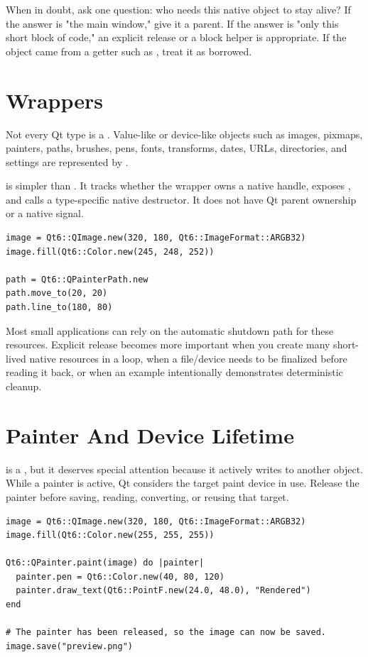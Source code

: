 When in doubt, ask one question: who needs this native object to stay alive? If the answer is "the main window," give it a parent. If the answer is "only this short block of code," an explicit  release or a block helper is appropriate. If the object came from a getter such as , treat it as borrowed.

\section{ Wrappers}

Not every Qt type is a . Value-like or device-like objects such as images, pixmaps, painters, paths, brushes, pens, fonts, transforms, dates, URLs, directories, and settings are represented by .

 is simpler than . It tracks whether the wrapper owns a native handle, exposes , and calls a type-specific native destructor. It does not have Qt parent ownership or a native  signal.

\begin{lstlisting}[style=crystal]
image = Qt6::QImage.new(320, 180, Qt6::ImageFormat::ARGB32)
image.fill(Qt6::Color.new(245, 248, 252))

path = Qt6::QPainterPath.new
path.move_to(20, 20)
path.line_to(180, 80)
\end{lstlisting}

Most small applications can rely on the automatic shutdown path for these resources. Explicit release becomes more important when you create many short-lived native resources in a loop, when a file/device needs to be finalized before reading it back, or when an example intentionally demonstrates deterministic cleanup.

\section{Painter And Device Lifetime}

 is a , but it deserves special attention because it actively writes to another object. While a painter is active, Qt considers the target paint device in use. Release the painter before saving, reading, converting, or reusing that target.

\begin{lstlisting}[style=crystal]
image = Qt6::QImage.new(320, 180, Qt6::ImageFormat::ARGB32)
image.fill(Qt6::Color.new(255, 255, 255))

Qt6::QPainter.paint(image) do |painter|
  painter.pen = Qt6::Color.new(40, 80, 120)
  painter.draw_text(Qt6::PointF.new(24.0, 48.0), "Rendered")
end

# The painter has been released, so the image can now be saved.
image.save("preview.png")
\end{lstlisting}

